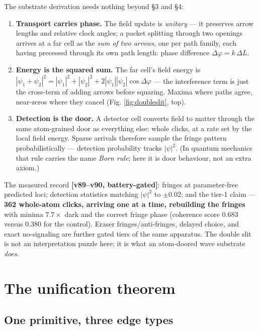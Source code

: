 The substrate derivation needs nothing beyond §3 and §4:

\begin{enumerate}
\def\labelenumi{\arabic{enumi}.}
\tightlist
\item
  \textbf{Transport carries phase.} The field update is \emph{unitary}
  --- it preserves arrow lengths and relative clock angles; a packet
  splitting through two openings arrives at a far cell as the \emph{sum
  of two arrows}, one per path family, each having precessed through its
  own path length: phase difference \(\Delta\varphi = k\,\Delta L\).
\item
  \textbf{Energy is the squared sum.} The far cell's field energy is
  \(|\psi_1 + \psi_2|^2 = |\psi_1|^2 + |\psi_2|^2 + 2|\psi_1||\psi_2|\cos\Delta\varphi\)
  --- the interference term is just the cross-term of adding arrows
  before squaring. Maxima where paths agree, near-zeros where they
  cancel (Fig. \ref{fig:doubleslit}, top).
\item
  \textbf{Detection is the door.} A detector cell converts field to
  matter through the same atom-grained door as everything else: whole
  clicks, at a rate set by the local field energy. Sparse arrivals
  therefore sample the fringe pattern probabilistically --- detection
  probability tracks \(|\psi|^2\). (In quantum mechanics that rule
  carries the name \emph{Born rule}; here it is door behaviour, not an
  extra axiom.)
\end{enumerate}

The measured record \textbf{{[}v89--v90, battery-gated{]}}: fringes at
parameter-free predicted loci; detection statistics matching
\(|\psi|^2\) to \(\pm 0.02\); and the tier-1 claim --- \textbf{362
whole-atom clicks, arriving one at a time, rebuilding the fringes} with
minima \(7.7\times\) dark and the correct fringe phase (coherence score
0.683 versus 0.380 for the control). Eraser fringes/anti-fringes,
delayed choice, and exact no-signaling are further gated tiers of the
same apparatus. The double slit is not an interpretation puzzle here; it
is what an atom-doored wave substrate \emph{does}.

\section{The unification theorem}\label{the-unification-theorem}

\subsection{One primitive, three edge
types}\label{one-primitive-three-edge-types}

